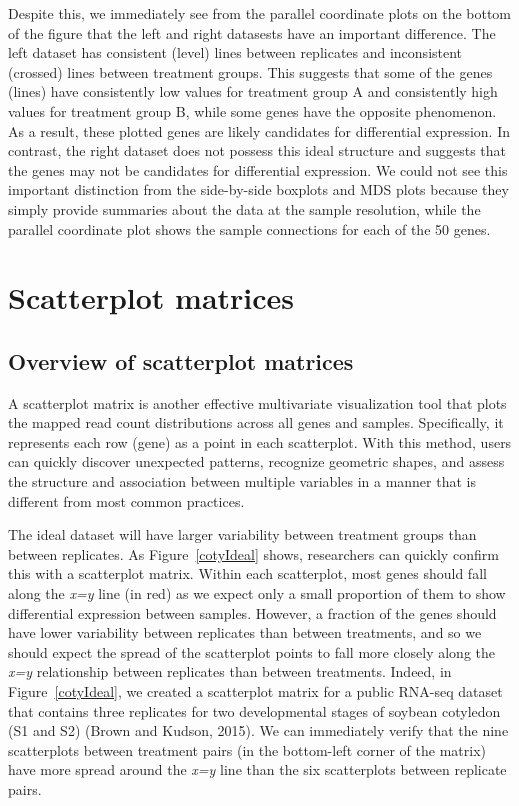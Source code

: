 \documentclass[useAMS,referee]{biom}
\begin{document}
Despite this, we immediately see from the parallel coordinate plots on the bottom of the figure that the left and right datasests have an important difference. The left dataset has consistent (level) lines between replicates and inconsistent (crossed) lines between treatment groups. This suggests that some of the genes (lines) have consistently low values for treatment group A and consistently high values for treatment group B, while some genes have the opposite phenomenon. As a result, these plotted genes are likely candidates for differential expression. In contrast, the right dataset does not possess this ideal structure and suggests that the genes may not be candidates for differential expression. We could not see this important distinction from the side-by-side boxplots and MDS plots because they simply provide summaries about the data at the sample resolution, while the parallel coordinate plot shows the sample connections for each of the 50 genes.

\section{Scatterplot matrices}
\label{s:Scatterplot matrices}

\subsection{Overview of scatterplot matrices}
\label{s:Overview of scatterplot matrices}

A scatterplot matrix is another effective multivariate visualization tool that plots the mapped read count distributions across all genes and samples. Specifically, it represents each row (gene) as a point in each scatterplot. With this method, users can quickly discover unexpected patterns, recognize geometric shapes, and assess the structure and association between multiple variables in a manner that is different from most common practices. 

The ideal dataset will have larger variability between treatment groups than between replicates. As Figure~\ref{cotyIdeal} shows, researchers can quickly confirm this with a scatterplot matrix. Within each scatterplot, most genes should fall along the \textit{x=y} line (in red) as we expect only a small proportion of them to show differential expression between samples. However, a fraction of the genes should have lower variability between replicates than between treatments, and so we should expect the spread of the scatterplot points to fall more closely along the \textit{x=y} relationship between replicates than between treatments. Indeed, in Figure~\ref{cotyIdeal}, we created a scatterplot matrix for a public RNA-seq dataset that contains three replicates for two developmental stages of soybean cotyledon (S1 and S2) (Brown and Kudson, 2015). We can immediately verify that the nine scatterplots between treatment pairs (in the bottom-left corner of the matrix) have more spread around the \textit{x=y} line than the six scatterplots between replicate pairs.
\end{document}
